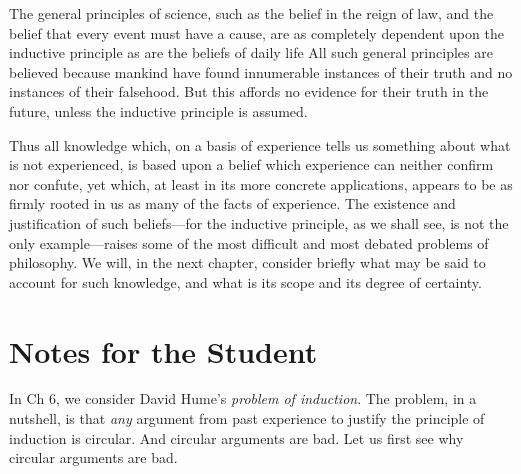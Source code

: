 \documentclass[oneside,letterpaper,12pt]{book}
\begin{document}
The general principles of science, such as the belief in the reign of
law, and the belief that every event must have a cause, are as
completely dependent upon the inductive principle as are the beliefs of
daily life All such general principles are believed because mankind have
found innumerable instances of their truth and no instances of their
falsehood. But this affords no evidence for their truth in the future,
unless the inductive principle is assumed.

Thus all knowledge which, on a basis of experience tells us something
about what is not experienced, is based upon a belief which experience
can neither confirm nor confute, yet which, at least in its more
concrete applications, appears to be as firmly rooted in us as many of
the facts of experience. The existence and justification of such
beliefs---for the inductive principle, as we shall see, is not the only
example---raises some of the most difficult and most debated problems of
philosophy. We will, in the next chapter, consider briefly what may be
said to account for such knowledge, and what is its scope and its degree
of certainty.

\protect\hypertarget{link2HCH0007}{}{}

\pagebreak
\section{Notes for the Student}
In Ch 6, we consider David Hume's \textit{problem of induction}. The problem, in a nutshell, is that \textit{any} argument from past experience to justify the principle of induction is circular. And circular arguments are bad. Let us first see why circular arguments are bad.
\end{document}

